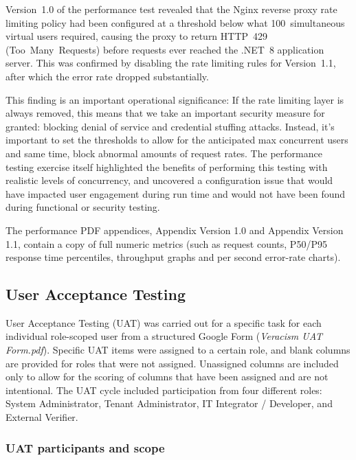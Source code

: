 \noindent Version~1.0 of the performance test revealed that the Nginx reverse proxy
rate limiting policy had been configured at a threshold below what
100~simultaneous virtual users required, causing the proxy to return
HTTP~429 (Too~Many~Requests) before requests ever reached the .NET~8
application server.  This was confirmed by disabling the rate limiting rules
for Version~1.1, after which the error rate dropped substantially.

This finding is an important operational significance: If the rate limiting layer is always removed, this means that we  take an important security measure for granted: blocking denial of service and credential stuffing attacks. Instead, it's important to set the thresholds to allow for the anticipated max concurrent users and same time, block abnormal amounts of request rates. The performance testing exercise itself highlighted the benefits of performing this testing with realistic levels of concurrency, and uncovered a configuration issue that would have impacted user engagement during run time and would not have been found during functional or security testing.

The performance PDF appendices, Appendix Version 1.0 and Appendix Version 1.1, contain a copy of full numeric metrics (such as request counts, P50/P95 response time percentiles, throughput graphs and per second error-rate charts). 

\subsection{User Acceptance Testing}

User Acceptance Testing (UAT) was carried out for a specific task for each individual role-scoped user from a structured Google Form (\textit{Veracism UAT Form.pdf}).  Specific UAT items were assigned to a certain role, and blank columns are provided for roles that were not assigned. Unassigned columns are included only to allow for the scoring of columns that have been assigned and are not intentional. The UAT cycle included participation from four different roles: System Administrator, Tenant Administrator, IT Integrator / Developer, and External Verifier.

\subsubsection{UAT participants and scope}

